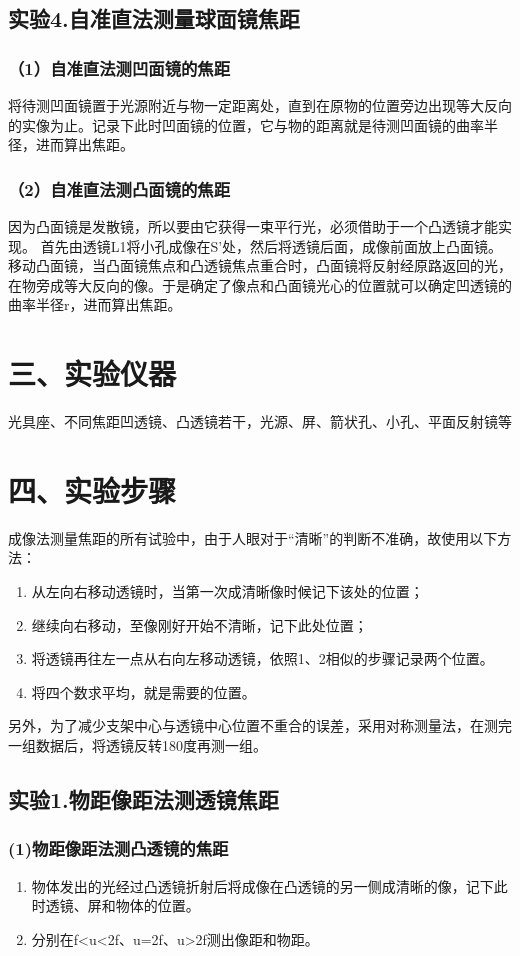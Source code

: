 \documentclass[11pt,a4paper,oneside]{article}
\begin{document}
\subsection*{实验4.自准直法测量球面镜焦距}
\subsubsection*{（1）自准直法测凹面镜的焦距}
将待测凹面镜置于光源附近与物一定距离处，直到在原物的位置旁边出现等大反向的实像为止。记录下此时凹面镜的位置，它与物的距离就是待测凹面镜的曲率半径，进而算出焦距。
\subsubsection*{（2）自准直法测凸面镜的焦距}
因为凸面镜是发散镜，所以要由它获得一束平行光，必须借助于一个凸透镜才能实现。
首先由透镜L1将小孔成像在S’处，然后将透镜后面，成像前面放上凸面镜。移动凸面镜，当凸面镜焦点和凸透镜焦点重合时，凸面镜将反射经原路返回的光，在物旁成等大反向的像。于是确定了像点和凸面镜光心的位置就可以确定凹透镜的曲率半径r，进而算出焦距。

\section*{三、实验仪器}
光具座、不同焦距凹透镜、凸透镜若干，光源、屏、箭状孔、小孔、平面反射镜等

\section*{四、实验步骤}
成像法测量焦距的所有试验中，由于人眼对于“清晰”的判断不准确，故使用以下方法：
\begin{enumerate}
\item 从左向右移动透镜时，当第一次成清晰像时候记下该处的位置；
\item 继续向右移动，至像刚好开始不清晰，记下此处位置；
\item 将透镜再往左一点从右向左移动透镜，依照1、2相似的步骤记录两个位置。
\item 将四个数求平均，就是需要的位置。
\end{enumerate}

另外，为了减少支架中心与透镜中心位置不重合的误差，采用对称测量法，在测完一组数据后，将透镜反转180度再测一组。

\subsection*{实验1.物距像距法测透镜焦距}
\subsubsection*{(1)物距像距法测凸透镜的焦距}
\begin{enumerate}
\item 物体发出的光经过凸透镜折射后将成像在凸透镜的另一侧成清晰的像，记下此时透镜、屏和物体的位置。
\item 分别在f<u<2f、u=2f、u>2f测出像距和物距。
\end{enumerate}
\end{document}

